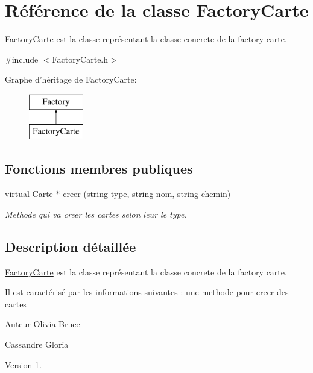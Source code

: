 \hypertarget{classFactoryCarte}{\section{\-Référence de la classe \-Factory\-Carte}
\label{classFactoryCarte}
}


\hyperlink{classFactoryCarte}{\-Factory\-Carte} est la classe représentant la classe concrete de la factory carte.  




{\ttfamily \#include $<$\-Factory\-Carte.\-h$>$}

\-Graphe d'héritage de \-Factory\-Carte\-:\begin{figure}[H]
\begin{center}
\leavevmode
\includegraphics[height=2.000000cm]{classFactoryCarte}
\end{center}
\end{figure}
\subsection*{\-Fonctions membres publiques}
\begin{DoxyCompactItemize}
\item 
virtual \hyperlink{classCarte}{\-Carte} $\ast$ \hyperlink{classFactoryCarte_aaca6e8fe045a19c4ac1a6746abfb23bc}{creer} (string type, string nom, string chemin)
\begin{DoxyCompactList}\small\item\em \-Methode qui va creer les cartes selon leur le type. \end{DoxyCompactList}\end{DoxyCompactItemize}


\subsection{\-Description détaillée}
\hyperlink{classFactoryCarte}{\-Factory\-Carte} est la classe représentant la classe concrete de la factory carte. 

\-Il est caractérisé par les informations suivantes \-: une methode pour creer des cartes

\begin{DoxyAuthor}{\-Auteur}
\-Olivia \-Bruce 

\-Cassandre \-Gloria 
\end{DoxyAuthor}
\begin{DoxyVersion}{\-Version}
1. 
\end{DoxyVersion}


